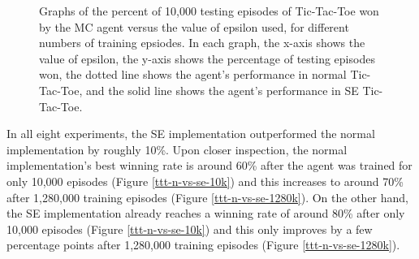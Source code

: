\documentclass[11pt,a4paper]{report}
\begin{document}
\begin{figure}

    \caption{Graphs of the percent of 10,000 testing episodes of Tic-Tac-Toe won by the MC agent versus the value of epsilon used, for different numbers of training epsiodes. In each graph, the x-axis shows the value of epsilon, the y-axis shows the percentage of testing episodes won, the dotted line shows the agent's performance in normal Tic-Tac-Toe, and the solid line shows the agent's performance in SE Tic-Tac-Toe.}
    \label{fig:tictactoe-normal-vs-symmetric-equality-epsilon}
\end{figure}

In all eight experiments, the SE implementation outperformed the normal implementation by roughly 10\%. Upon closer inspection, the normal implementation's best winning rate is around 60\% after the agent was trained for only 10,000 episodes (Figure \ref{ttt-n-vs-se-10k}) and this increases to around 70\% after 1,280,000 training episodes (Figure \ref{ttt-n-vs-se-1280k}). On the other hand, the SE implementation already reaches a winning rate of around 80\% after only 10,000 episodes (Figure \ref{ttt-n-vs-se-10k}) and this only improves by a few percentage points after 1,280,000 training episodes (Figure \ref{ttt-n-vs-se-1280k}).
\end{document}

